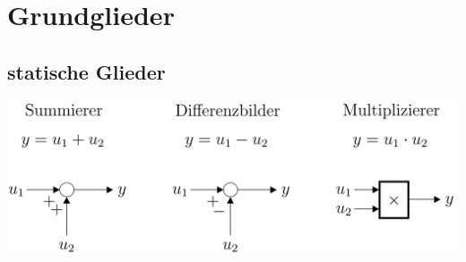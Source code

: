\section{Grundglieder }
	\subsection{statische Glieder }
		\includegraphics[width=10 cm]{./bilder/grundglieder/statischeGlieder.png} \\
	
